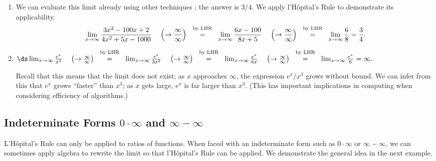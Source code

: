 \begin{solution}
{\begin{enumerate}
\item		We can evaluate this limit already using other techniques%
; the answer is $ 3/4 $. We apply l'H\^opital's Rule to demonstrate its applicability.
$$\lim_{x\to\infty} \frac{3x^2-100x+2}{4x^2+5x-1000} \;\;\;\;\left(\to \frac\infty\infty \right) \stackrel{\ \text{ by LHR \rule[-5pt]{0pt}{3pt}} \ }{=} \lim_{x\to\infty} \frac{6x-100}{8x+5} \;\;\;\;\left(\to \frac\infty\infty \right) \stackrel{\ \text{ by LHR \rule[-5pt]{0pt}{3pt}} \ }{=} \lim_{x\to\infty} \frac68 = \frac34.$$

\item		$\ds \lim_{x\to \infty}\frac{e^x}{x^3} \;\;\;\;\left(\to \frac\infty\infty \right) \stackrel{\ \text{ by LHR \rule[-5pt]{0pt}{3pt}} \ }{=} \lim_{x\to\infty} \frac{e^x}{3x^2} \;\;\;\;\left(\to \frac\infty\infty \right) \stackrel{\ \text{ by LHR \rule[-5pt]{0pt}{3pt}} \ }{=} \lim_{x\to\infty} \frac{e^x}{6x} \;\;\;\;\left(\to \frac\infty\infty \right) \stackrel{\ \text{ by LHR \rule[-5pt]{0pt}{3pt}} \ }{=} \lim_{x\to\infty} \frac{e^x}{6} = \infty.$

Recall that this means that the limit does not exist; as $x$ approaches $\infty$, the expression $e^x/x^3$ grows without bound. We can infer from this that $e^x$ grows ``faster'' than $x^3$; as $x$ gets large, $e^x$ is far larger than $x^3$. (This has important implications in computing when considering efficiency of algorithms.)
\end{enumerate}
}
\end{solution}



\subsection*{Indeterminate Forms $0\cdot\infty$ and $\infty-\infty$}


L'H\^opital's Rule can only be applied to ratios of functions. When faced with an indeterminate form such as $0\cdot\infty$ or $\infty-\infty$, we can sometimes apply algebra to rewrite the limit so that l'H\^opital's Rule can be applied. We demonstrate the general idea in the next example.
\\



